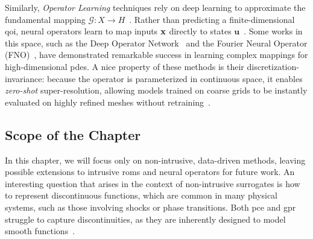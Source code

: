 \smallskip
Similarly, \textit{Operator Learning} techniques rely on deep learning to approximate the fundamental mapping $\mathcal{G}: X \rightarrow H$~\cite{Kovachki2023}. Rather than predicting a finite-dimensional \gls{qoi}, neural operators learn to map inputs $\mathbf{x}$ directly to states $\mathbf{u}$~\cite{Kovachki2023, Lu2021}. Some works in this space, such as the Deep Operator Network~\cite{Lu2021, Goswami2022} and the Fourier Neural Operator (FNO)~\cite{Kovachki2023, Kovachki2021}, have demonstrated remarkable success in learning complex mappings for high-dimensional \glspl{pde}. A nice property of these methods is their discretization-invariance: because the operator is parameterized in continuous space, it enables \textit{zero-shot} super-resolution, allowing models trained on coarse grids to be instantly evaluated on highly refined meshes without retraining~\cite{Kovachki2023}.

\subsection{Scope of the Chapter}

\bigskip
In this chapter, we will focus only on non-intrusive, data-driven methods, leaving possible extensions to intrusive \glspl{rom} and neural operators for future work. An interesting question that arises in the context of non-intrusive surrogates is how to represent discontinuous functions, which are common in many physical systems, such as those involving shocks or phase transitions. Both \gls{pce} and \gls{gpr} struggle to capture discontinuities, as they are inherently designed to model smooth functions~\cite{uq_theory, Sudret2023, Palar2024}. 

